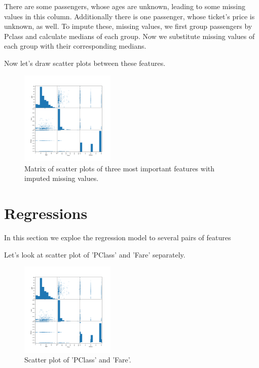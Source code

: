 \documentclass[12pt]{article}
\begin{document}
There are some passengers, whose ages are unknown, leading to some missing values in this column. Additionally there is one passenger, whose ticket's price is unknown, as well. To impute these, missing values, we first group passengers by Pclass and calculate medians of each group. Now we substitute missing values of each group with their corresponding medians.

Now let's draw scatter plots between these features.

\begin{figure}[ht!]
    \centering
    \includegraphics[width=0.4\textwidth]{figs/figure_2.png}
    \caption{Matrix of scatter plots of three most important features with imputed missing values.}
\end{figure}

\section{Regressions}

In this section we exploe the regression model to several pairs of features

Let's look at scatter plot of 'PClass' and 'Fare' separately.

\begin{figure}[ht!]
    \centering
    \includegraphics[width=0.4\textwidth]{figs/figure_3.png}
    \caption{Scatter plot of 'PClass' and 'Fare'.}
\end{figure}
\end{document}
